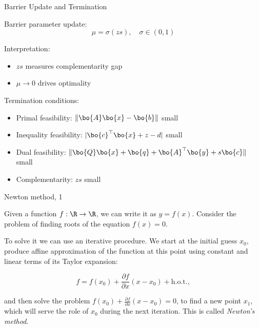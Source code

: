 \documentclass{beamer}
\begin{document}
\begin{frame}{Barrier Update and Termination}
	\begin{flushleft}
		
		Barrier parameter update:
		\[
		\mu = \sigma (z s), \quad \sigma \in (0,1)
		\]
		
		\vspace{0.5em}
		
		Interpretation:
		\begin{itemize}
			\item $zs$ measures complementarity gap
			\item $\mu \to 0$ drives optimality
		\end{itemize}
		
		\vspace{0.5em}
		
		Termination conditions:
		\begin{itemize}
			\item Primal feasibility: $\|\bo{A}\bo{x} - \bo{b}\|$ small
			\item Inequality feasibility: $|\bo{c}^\top \bo{x} + z - d|$ small
			\item Dual feasibility: $\|\bo{Q}\bo{x} + \bo{q} + \bo{A}^\top \bo{y} + s\bo{c}\|$ small
			\item Complementarity: $zs$ small
		\end{itemize}
		
	\end{flushleft}
\end{frame}


\begin{frame}{Newton method, 1}
	\begin{flushleft}
		
		Given a function $f: \R \rightarrow \R$, we can write it as $y = f(x)$. Consider the problem of finding roots of the equation $f(x) = 0$.
		
		\bigskip
		
		To solve it we can use an iterative procedure. We start at the initial guess $x_0$, produce affine approximation of the function at this point using constant and linear terms of its Taylor expansion:
		
		\begin{equation}
			f = f(x_0) + \frac{\partial f}{\partial x} (x - x_0) + \text{h.o.t.},
		\end{equation}
		
		and then solve the problem $f(x_0) + \frac{\partial f}{\partial x} (x - x_0) = 0$, to find a new point $x_1$, which will serve the role of $x_0$ during the next iteration. This is called \emph{Newton's method}.
		
	\end{flushleft}
\end{frame}
\end{document}
